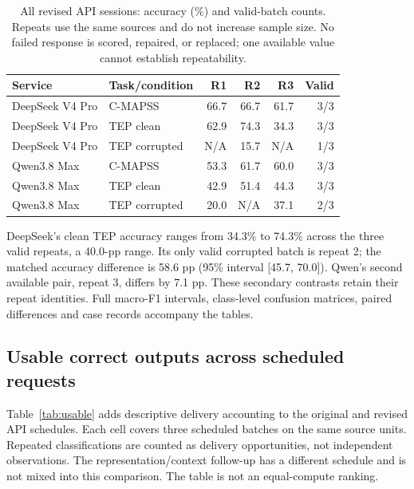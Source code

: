 \documentclass[11pt,a4paper]{article}
\begin{document}
\begin{table}[htbp]
\centering
\small
\caption{All revised API sessions: accuracy (\%) and valid-batch counts. Repeats use the same sources and do not increase sample size. No failed response is scored, repaired, or replaced; one available value cannot establish repeatability.}
\label{tab:domestic_repeat}
\begin{tabular}{@{}llrrrr@{}}
\toprule
Service & Task/condition & R1 & R2 & R3 & Valid \\
\midrule
DeepSeek V4 Pro & C-MAPSS & 66.7 & 66.7 & 61.7 & 3/3 \\
DeepSeek V4 Pro & TEP clean & 62.9 & 74.3 & 34.3 & 3/3 \\
DeepSeek V4 Pro & TEP corrupted & N/A & 15.7 & N/A & 1/3 \\
Qwen3.8 Max & C-MAPSS & 53.3 & 61.7 & 60.0 & 3/3 \\
Qwen3.8 Max & TEP clean & 42.9 & 51.4 & 44.3 & 3/3 \\
Qwen3.8 Max & TEP corrupted & 20.0 & N/A & 37.1 & 2/3 \\
\bottomrule
\end{tabular}
\end{table}

DeepSeek's clean TEP accuracy ranges from 34.3\% to 74.3\% across the three valid repeats, a 40.0-pp range. Its only valid corrupted batch is repeat 2; the matched accuracy difference is 58.6 pp (95\% interval [45.7, 70.0]). Qwen's second available pair, repeat 3, differs by 7.1 pp. These secondary contrasts retain their repeat identities. Full macro-F1 intervals, class-level confusion matrices, paired differences and case records accompany the tables.
\FloatBarrier

\subsection{Usable correct outputs across scheduled requests}
Table~\ref{tab:usable} adds descriptive delivery accounting to the original and revised API schedules. Each cell covers three scheduled batches on the same source units. Repeated classifications are counted as delivery opportunities, not independent observations. The representation/context follow-up has a different schedule and is not mixed into this comparison. The table is not an equal-compute ranking.
\end{document}
